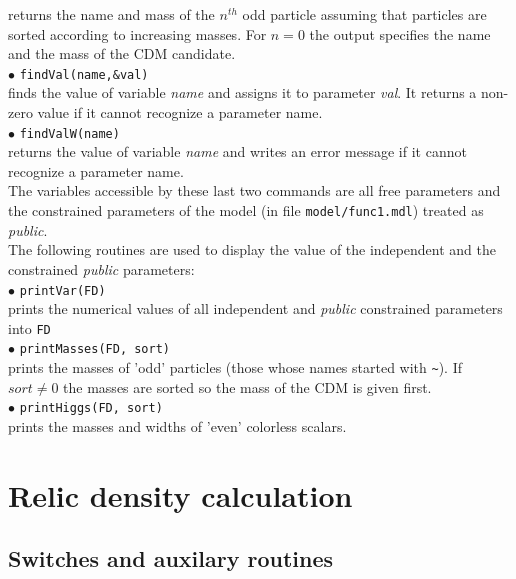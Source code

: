 \documentclass[12pt,a4paper]{article}
\begin{document}
returns the name and mass of the $n^{th}$ odd particle assuming that particles are 
sorted according to increasing masses. For $n=0$ the output specifies the 
name and the mass of the CDM candidate. \\[2mm]
%
$\bullet$ \verb|findVal(name,&val)|\\
 finds the  value of
 variable  {\it name} and assigns it to parameter {\it val}. It returns a non-zero
value  if it cannot recognize  a parameter name.\\[2mm]
%
$\bullet$ \verb|findValW(name)| \\
returns the value of variable {\it name} and writes an error message
if it cannot recognize  a parameter name.\\[2mm]

\noindent
The variables accessible by these last two commands are all free parameters and   the 
constrained parameters of the model (in file \verb|model/func1.mdl|)
treated as {\it public}. \\


The following routines are used to display the value of the independent and the constrained 
{\it public} parameters:\\[2mm]
% 
$\bullet$ \verb|printVar(FD)|\\ 
prints the numerical values of all independent and {\it public} 
constrained parameters into \verb|FD|\\[2mm]
%
$\bullet$ \verb|printMasses(FD, sort)|\\
 prints the masses of 'odd' particles
(those whose names  started with \verb|~|). If $sort\ne 0$
the masses are sorted so the mass of the CDM is given first.\\[2mm]
%
$\bullet$ \verb|printHiggs(FD, sort)|\\
prints the masses and widths of 'even' colorless scalars.


\section{Relic density calculation}
\subsection{Switches and auxilary routines}
\end{document}

